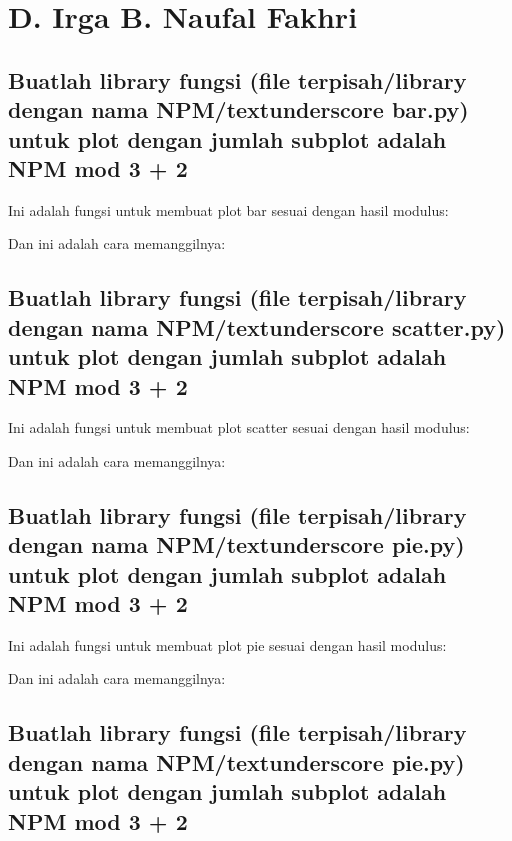 \section{D. Irga B. Naufal Fakhri}
\subsection{Buatlah library fungsi (file terpisah/library dengan nama NPM/textunderscore bar.py) untuk plot dengan jumlah subplot adalah NPM mod 3 + 2}

Ini adalah fungsi untuk membuat plot bar sesuai dengan hasil modulus:


Dan ini adalah cara memanggilnya:


\subsection{Buatlah library fungsi (file terpisah/library dengan nama NPM/textunderscore scatter.py) untuk plot dengan jumlah subplot adalah NPM mod 3 + 2}

Ini adalah fungsi untuk membuat plot scatter sesuai dengan hasil modulus:


Dan ini adalah cara memanggilnya:


\subsection{Buatlah library fungsi (file terpisah/library dengan nama NPM/textunderscore pie.py) untuk plot dengan jumlah subplot adalah NPM mod 3 + 2}

Ini adalah fungsi untuk membuat plot pie sesuai dengan hasil modulus:


Dan ini adalah cara memanggilnya:


\subsection{Buatlah library fungsi (file terpisah/library dengan nama NPM/textunderscore pie.py) untuk plot dengan jumlah subplot adalah NPM mod 3 + 2}

